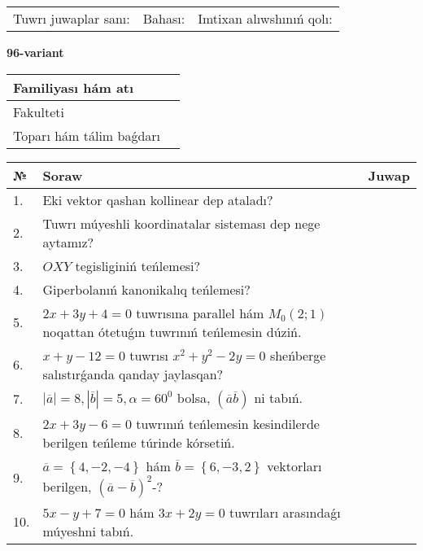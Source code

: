 \documentclass{article}
\begin{document}
\vspace{1cm}

\begin{tabular}{lll}
Tuwrı juwaplar sanı: \underline{\hspace{1.5cm}} & 
Bahası: \underline{\hspace{1.5cm}} & 
Imtixan alıwshınıń qolı: \underline{\hspace{2cm}} \\
\end{tabular}

\egroup

\newpage


\textbf{96-variant}\\

\bgroup
\def\arraystretch{1.6} %

\begin{tabular}{|m{5.7cm}|m{9.5cm}|}
\hline
Familiyası hám atı & \\
\hline
Fakulteti  & \\
\hline
Toparı hám tálim baǵdarı  & \\
\hline
\end{tabular}

\vspace{1cm}

\begin{tabular}{|m{0.7cm}|m{10cm}|m{4cm}|}
\hline
№ & Soraw & Juwap \\
\hline
1. & Eki vektor qashan kollinear dep ataladı? &  \\
\hline
2. & Tuwrı múyeshli koordinatalar sisteması dep nege aytamız? &  \\
\hline
3. & $OXY$ tegisliginiń teńlemesi? &  \\
\hline
4. & Giperbolanıń kanonikalıq teńlemesi? &  \\
\hline
5. & $2x+3y+4=0$ tuwrısına parallel hám $M_{0} (2;1)$ noqattan ótetuǵın tuwrınıń teńlemesin dúziń. &  \\
\hline
6. & $x+y-12=0$ tuwrısı $x^{2}+y^{2}-2y=0$ sheńberge salıstırǵanda qanday jaylasqan? &  \\
\hline
7. & $\left| \overline{a} \right|=8, \left| \overline{b} \right|=5, \alpha=60^{0}$ bolsa, $( \overline{a}\overline{b} )$ ni tabıń. &  \\
\hline
8. & $2x+3y-6=0$ tuwrınıń teńlemesin kesindilerde berilgen teńleme túrinde kórsetiń. &  \\
\hline
9. & $\overline{a}=\left\{ 4,-2,-4 \right\}$ hám $\overline{b}=\left\{ 6,-3, 2 \right\}$ vektorları berilgen, $(\overline{a}-\overline{b}) ^{2}$-? &  \\
\hline
10. & $5x-y+7=0$ hám $3x+2y=0$ tuwrıları arasındaǵı múyeshni tabıń. &  \\
\hline
\end{tabular}
\end{document}
